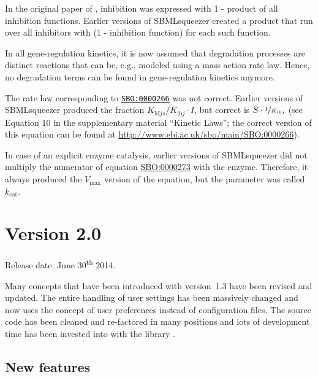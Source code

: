 \begin{dinglist}{54}
\item In the original paper of \citet{Hinze2007}, inhibition was expressed with 1 -
product of all inhibition functions. Earlier versions of SBMLsqueezer created a
product that run over all inhibitors with (1 - inhibition function) for each
such function.

\item In all gene-regulation kinetics, it is now assumed that degradation processes
are distinct reactions that can be, e.g., modeled using a mass action rate law.
Hence, no degradation terms can be found in gene-regulation kinetics anymore.

\item The rate law corresponding to
\href{identifiers.org/biomodels.sbo/SBO:0000266}{\texttt{SBO:0000266}} was not correct.
Earlier versions of SBMLsqueezer produced the fraction $K_{\mathrm{M}js}/K_{\mathrm{ib}j}\cdot I$, but
correct is $S\cdot\nicefrac{I}{K_{\mathrm{ib}j}}$ (see Equation 10 in the supplementary material ``Kinetic
Laws''; the correct version of this equation can be found at
\url{http://www.ebi.ac.uk/sbo/main/SBO:0000266}).

\item In case of an explicit enzyme catalysis, earlier versions of SBMLsqueezer did not
multiply the numerator of equation
\href{identifiers.org/biomodels.sbo/SBO:0000273}{SBO:0000273} with the enzyme.
Therefore, it always produced the $V_\mathrm{max}$ version of the equation, but the parameter
was called $k_\mathrm{cat}$.
\end{dinglist}

\section{Version 2.0}

Release date: June 30\textsuperscript{th} 2014.

Many concepts that have been introduced with version~1.3 have been revised and updated. The
entire handling of user settings has been massively changed and now uses the concept of user
preferences instead of configuration files. The source code has been cleaned and re-factored in
many positions and lots of development time has been invested into with the library \JSBML.

\subsection{New features}

